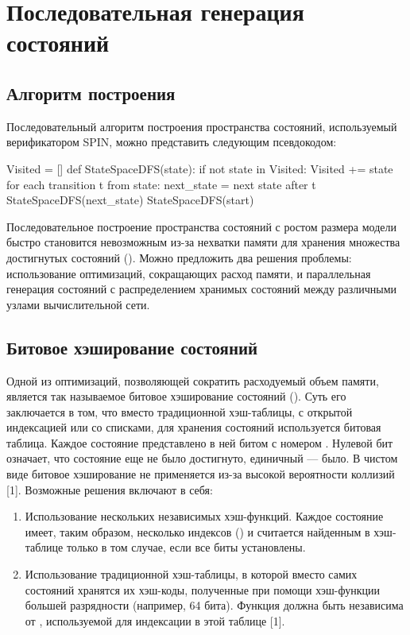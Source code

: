 \chapter{Последовательная генерация состояний}
\label{sec:seq-statespace}

\section{Алгоритм построения}
\label{sec:seq-algo}

Последовательный алгоритм построения пространства состояний,
используемый верификатором SPIN, можно представить следующим
псевдокодом:

\begin{CodeBlock}
Visited = []
def StateSpaceDFS(state):
    if not state in Visited:
        Visited += state
        for each transition t from state:
            next_state = next state after t
            StateSpaceDFS(next_state)
StateSpaceDFS(start)
\end{CodeBlock}

Последовательное построение пространства состояний с ростом размера
модели быстро становится невозможным из-за нехватки памяти для
хранения множества достигнутых состояний (). Можно предложить
два решения проблемы: использование оптимизаций, сокращающих расход
памяти, и параллельная генерация состояний с распределением хранимых
состояний между различными узлами вычислительной сети.

\section{Битовое хэширование состояний}
\label{sec:bit-hashing}

Одной из оптимизаций, позволяющей сократить расходуемый объем памяти,
является так называемое битовое хэширование состояний (). Суть его заключается в том, что вместо традиционной
хэш-таблицы, с открытой индексацией или со списками, для хранения
состояний используется битовая таблица. Каждое состояние 
представлено в ней битом с номером . Нулевой бит означает,
что состояние еще не было достигнуто, единичный — было. В чистом виде
битовое хэширование не применяется из-за высокой вероятности коллизий
[1]. Возможные решения включают в себя:

\begin{enumerate}
\item Использование нескольких независимых хэш-функций. Каждое
  состояние имеет, таким образом, несколько индексов () и считается найденным в
  хэш-таблице только в том случае, если все биты 
  установлены.

\item Использование традиционной хэш-таблицы, в которой вместо самих
  состояний хранятся их хэш-коды, полученные при помощи хэш-функции
   большей разрядности (например, 64 бита). Функция 
  должна быть независима от , используемой для индексации в этой
  таблице [1].
\end{enumerate}


